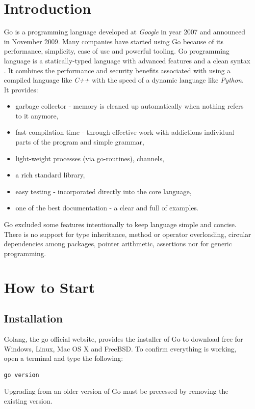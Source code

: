 \documentclass[
  digital, %
  notable,   %
  lof,     %
  lot,     %
]{fithesis3}
\begin{document}
\section{Introduction}
Go is a programming language developed at \textit{Google} in year 2007 and announced in 
November 2009. Many companies have started using Go because of its performance, simplicity, 
ease of use and powerful tooling. Go programming language is a statically-typed language with 
advanced features and a clean syntax \cite{doxsey2016introducing}. It combines the performance 
and security benefits associated with using a compiled language like \textit{C++} with the 
speed of a dynamic language like \textit{Python}. It provides:
\vskip0.1in
\begin{itemize}[leftmargin=2em,rightmargin=1em,itemsep=0.75\parskip,parsep=0em,topsep=0em,partopsep=0em]
\item garbage collector - memory is cleaned up automatically when nothing refers to it 
anymore,
\item fast compilation time - through effective work with addictions individual parts of the 
program and simple grammar,
\item light-weight processes (via go-routines), channels,
\item a rich standard library,
\item easy testing - incorporated directly into the core language,
\item one of the best documentation - a clear and full of examples.
\end{itemize}
\vskip0.1in

Go excluded some features intentionally to keep language simple and concise. There is no 
support for type inheritance, method or operator overloading, circular dependencies among 
packages, pointer arithmetic, assertions nor for generic programming.
\nocite{wiki-go}
\nocite{doxsey2016introducing}

\section{How to Start}\label{howToStart}
\subsection{Installation}
Golang, the go official website, provides the installer of Go to download free for Windows, 
Linux, Mac OS X and FreeBSD. To confirm everything is working, open a terminal and 
type the following:
\begin{lstlisting}
go version
\end{lstlisting}
Upgrading from an older version of Go must be precessed by removing the existing version. 
\end{document}
